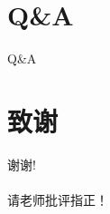 \documentclass{beamer}
\begin{document}

	\section*{Q\&A}
	\begin{frame}
		\begin{center}
			\textcolor{myNewColorA}{\Huge {Q\&A}}
		\end{center}
	\end{frame}


	\section*{致谢}  
	\begin{frame}
		\begin{center}
			\textcolor{myNewColorA}{\Huge {谢谢!\\ \quad \\ 请老师批评指正！}}
		\end{center}
	\end{frame}
	
\end{document}
